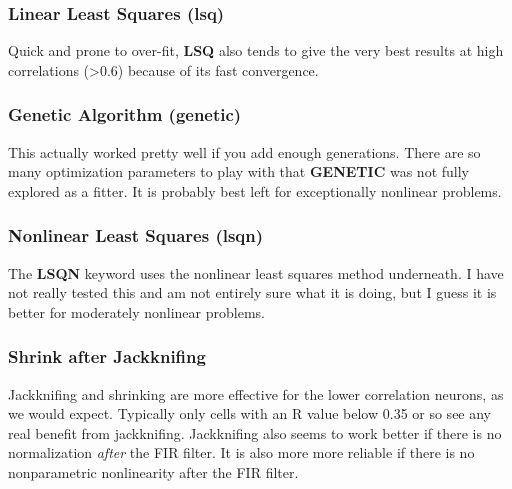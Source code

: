 \documentclass[11pt]{article}
\begin{document}
\subsubsection{Linear Least Squares (lsq)}
\label{sec-2.8.4}


    Quick and prone to over-fit, \textbf{LSQ} also tends to give the very best results at high correlations (>0.6) because of its fast convergence. 

\subsubsection{Genetic Algorithm (genetic)}
\label{sec-2.8.5}


    This actually worked pretty well if you add enough generations. There are so many optimization parameters to play with that \textbf{GENETIC} was not fully explored as a fitter. It is probably best left for exceptionally nonlinear problems.
   
\subsubsection{Nonlinear Least Squares (lsqn)}
\label{sec-2.8.6}


    The \textbf{LSQN} keyword uses the nonlinear least squares method underneath. I have not really tested this and am not entirely sure what it is doing, but I guess it is better for moderately nonlinear problems.

\subsubsection{Shrink after Jackknifing}
\label{sec-2.8.7}


    Jackknifing and shrinking are more effective for the lower correlation neurons, as we would expect. Typically only cells with an R value below 0.35 or so see any real benefit from jackknifing. Jackknifing also seems to work better if there is no normalization \emph{after} the FIR filter. It is also more more reliable if there is no nonparametric nonlinearity after the FIR filter. 
\end{document}
